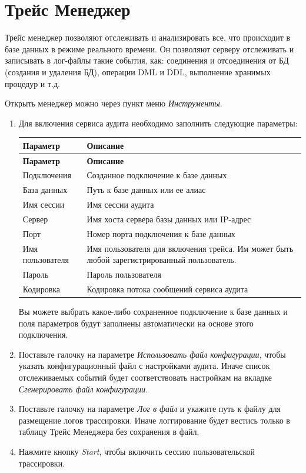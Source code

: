 \newpage

\section{Трейс Менеджер}\label{sec:trace_manager}

Трейс менеджер позволяют отслеживать и анализировать все, что происходит в базе данных в режиме реального времени. Он позволяют серверу отслеживать и записывать в лог-файлы такие события, как: соединения и отсоединения от БД (создания и удаления БД), операции DML и DDL, выполнение хранимых процедур и т.д. 

Открыть менеджер можно через пункт меню \textit{Инструменты}.


\begin{enumerate}[leftmargin=20pt]
	\item Для включения сервиса аудита необходимо заполнить следующие параметры:
	\begin{longtable}[r]{|>{\ttfamily}m{3cm}|m{11.5cm}|}
		\hline
		\centering\normalfont\bfseries Параметр &
		\centering\arraybslash\bfseries Описание\\\hline
		\endfirsthead
		\hline
		\centering\normalfont\bfseries Параметр &
		\centering\arraybslash\bfseries Описание\\\hline
		\endhead
		Подключения
		& Созданное подключение к базе данных \\\hline
		База данных
		& Путь к базе данных или ее алиас \\\hline
		Имя сессии 
		& Имя сессии аудита \\\hline
		Сервер
		& Имя хоста сервера базы данных или IP-адрес\\\hline
		Порт
		& Номер порта подключения к базе данных \\\hline
		Имя пользователя
		& Имя пользователя для включения трейса. Им может быть любой зарегистрированный пользователь. \\\hline
		Пароль
		& Пароль пользователя \\\hline
		Кодировка
		& Кодировка потока сообщений сервиса аудита \\\hline
	\end{longtable} 
	Вы можете выбрать какое-либо сохраненное подключение к базе данных и поля параметров будут заполнены автоматически на основе этого подключения. 
	\item Поставьте галочку на параметре \textit{Использовать файл конфигурации}, чтобы указать конфигурационный файл с настройками аудита. Иначе список отслеживаемых событий будет соответствовать настройкам на вкладке \textit{Сгенерировать файл конфигурации}.
	\item Поставьте галочку на параметре \textit{Лог в файл} и укажите путь к файлу для размещение логов трассировки. Иначе логгирование будет вестись только в таблицу Трейс Менеджера без сохранения в файл. 
	\item Нажмите кнопку \textit{Start}, чтобы включить сессию пользовательской трассировки.
\end{enumerate}	

